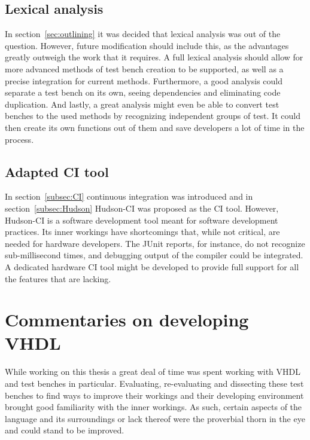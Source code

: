 \documentclass[11pt,british]{article}
\begin{document}
\subsection{Lexical analysis}
In section~\ref{sec:outlining} it was decided that lexical analysis was out of the question. However, future modification should include this, as the advantages greatly outweigh the work that it requires. A full lexical analysis should allow for more advanced methods of test bench creation to be supported, as well as a precise integration for current methods. Furthermore, a good analysis could separate a test bench on its own, seeing dependencies and eliminating code duplication. And lastly, a great analysis might even be able to convert test benches to the used methods by recognizing independent groups of test. It could then create its own functions out of them and save developers a lot of time in the process.

\subsection{Adapted CI tool}
In section~\ref{subsec:CI} continuous integration was introduced and in section~\ref{subsec:Hudson} Hudson-CI was proposed as the \gls{CI} tool. However, Hudson-CI is a software development tool meant for software development practices. Its inner workings have shortcomings that, while not critical, are needed for hardware developers. The JUnit reports, for instance, do not recognize sub-millisecond times, and debugging output of the compiler could be integrated. A dedicated hardware CI tool might be developed to provide full support for all the features that are lacking.




\newpage{}
\section{Commentaries on developing VHDL}
While working on this thesis a great deal of time was spent working with \gls{VHDL} and test benches in particular. Evaluating, re-evaluating and dissecting these test benches to find ways to improve their workings and their developing environment brought good familiarity with the inner workings. As such, certain aspects of the language and its surroundings or lack thereof were the proverbial thorn in the eye and could stand to be improved.
\end{document}

